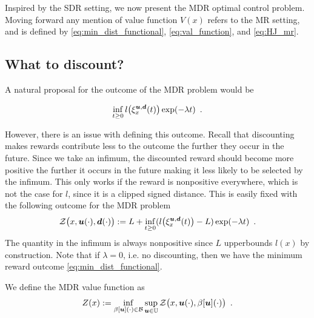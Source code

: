Inspired by the SDR setting, we now present the MDR optimal control problem. Moving forward any mention of value function $V(x)$ refers to the MR setting, and is defined by \eqref{eq:min_dist_functional}, \eqref{eq:val_function}, and \eqref{eq:HJ_mr}.

\subsection{What to discount?}

A natural proposal for the outcome of the MDR problem would be
 
\begin{equation}
\inf_{t\ge 0}l\big(\xi_{x}^{\bm{u},\bm{d}}(t)\big)\exp(-\lambda  t) \enspace.
\end{equation}

However, there is an issue with defining this outcome. Recall that discounting makes rewards contribute less to the outcome the further they occur in the future. Since we take an infimum, the discounted reward should become more positive the further it occurs in the future making it less likely to be selected by the infimum. This only works if the reward is nonpositive everywhere, which is not the case for $l$, since it is a clipped signed distance. This is easily fixed with the following outcome for the MDR problem
%
\begin{equation} \label{eq:mdr_functional}
\mathcal{Z}\big(x,\bm{u}(\cdot),\bm{d}(\cdot)\big) := L + \inf_{t\ge 0}(l\big(\xi_{x}^{\bm{u},\bm{d}}(t)\big)-L)\exp(-\lambda  t) \enspace.
\end{equation}%
\noindent The quantity in the infimum is always nonpositive since $L$ upperbounds $l(x)$ by construction. Note that if ${\lambda=0}$, i.e. no discounting, then we have the minimum reward outcome \eqref{eq:min_dist_functional}. 

We define the MDR value function as
%
\begin{equation} \label{eq:mdr_val_function}
Z(x):=\inf_{\beta[\bm{u}](\cdot) \in \mathcal{B}} \sup_{\bm{u} \in \mathbb{U}}\mathcal{Z}\big(x,\bm{u}(\cdot),\beta[\bm{u}](\cdot)\big) \enspace.
\end{equation}

%

